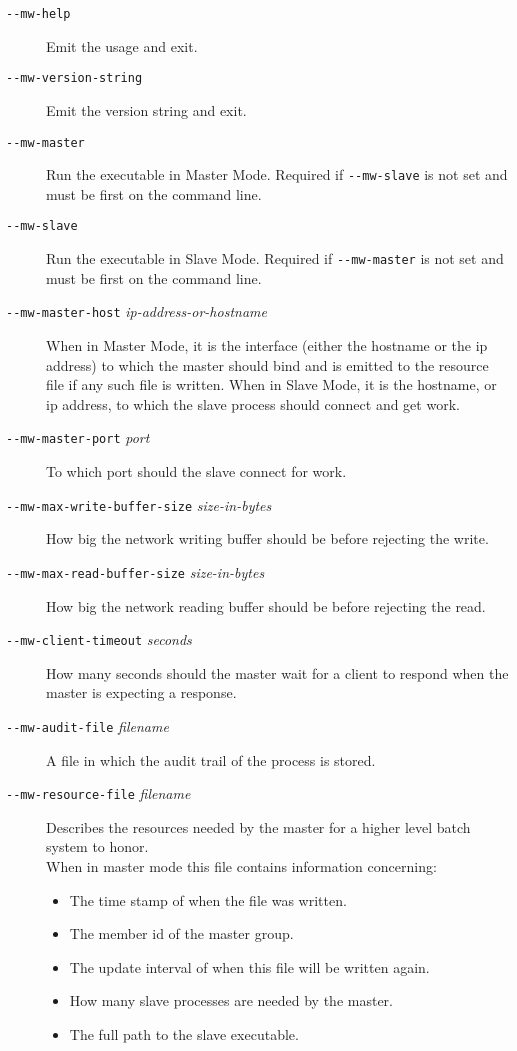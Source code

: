 \documentclass[titlepage,12pt]{book}
\newcommand{\dash}{\texttt{-}}
\newcommand{\Option}[1]{\dash\dash\texttt{#1}}
\newcommand{\OptionV}[2]{\dash\dash\texttt{#1} \textit{#2}}
\begin{document}
\begin{description}
\item[\Option{mw-help}]
    Emit the usage and exit.
\item[\Option{mw-version-string}]
    Emit the version string and exit.
\item[\Option{mw-master}]
    Run the executable in Master Mode. Required if \Option{mw-slave} is not set
	and must be first on the command line.
\item[\Option{mw-slave}]
    Run the executable in Slave Mode. Required if \Option{mw-master} is not set
	and must be first on the command line.
\item[\OptionV{mw-master-host}{ip-address-or-hostname}]
    When in Master Mode, it is the interface (either the hostname or
    the ip address) to which the master should bind and is emitted to
    the resource file if any such file is written.
    When in Slave Mode, it is the hostname, or ip address, to which
    the slave process should connect and get work.
\item[\OptionV{mw-master-port}{port}]
    To which port should the slave connect for work.
\item[\OptionV{mw-max-write-buffer-size}{size-in-bytes}]
    How big the network writing buffer should be before rejecting the write.
\item[\OptionV{mw-max-read-buffer-size}{size-in-bytes}]
    How big the network reading buffer should be before rejecting the read.
\item[\OptionV{mw-client-timeout}{seconds}]
    How many seconds should the master wait for a client to respond
    when the master is expecting a response.
\item[\OptionV{mw-audit-file}{filename}]
    A file in which the audit trail of the process is stored.
\item[\OptionV{mw-resource-file}{filename}]
    Describes the resources needed by the master for a higher level batch
    system to honor.\\
	When in master mode this file contains information concerning:
	\begin{itemize}
		\item The time stamp of when the file was written.
		\item The member id of the master group.
		\item The update interval of when this file will be written again.
		\item How many slave processes are needed by the master.
		\item The full path to the slave executable.

\end{itemize}
\end{description}
\end{document}
